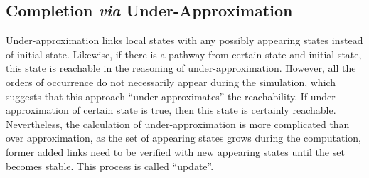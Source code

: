 \subsection{Completion \textit{via} Under-Approximation}
Under-approximation links local states with any possibly appearing states instead of initial state. Likewise, if there is a pathway from certain state and initial state, this state is reachable in the reasoning of under-approximation. However, all the orders of occurrence do not necessarily appear during the simulation, which suggests that this approach ``under-approximates'' the reachability. If under-approximation of certain state is true, then this state is certainly reachable. Nevertheless, the calculation of under-approximation is more complicated than over approximation, as the set of appearing states grows during the computation, former added links need to be verified with new appearing states until the set becomes stable. This process is called ``update''. 

